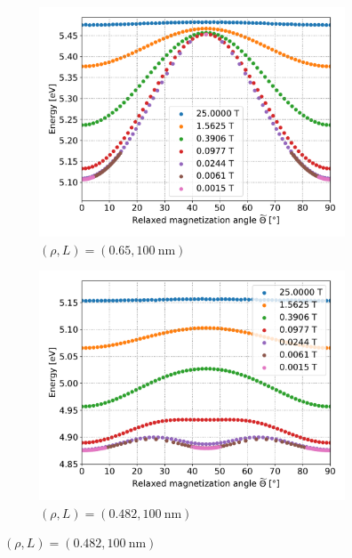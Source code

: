\documentclass[11pt,a4paper,english]{article}
\begin{document}
\begin{figure}
     \centering
     \begin{subfigure}[b]{0.8\textwidth}
         \centering
         \includegraphics[width=\textwidth]{Figures/biaxial_island/BarrierLandscape/Plus_65_B25-0.001-div4_a128Pi_plotOptimized.pdf}
         \caption{$(\rho, L)=(0.65, \SI{100}{\nano\metre})$}
         \label{fig:barrierLandscape-sweepBext_r0.65}
     \end{subfigure}
     \begin{subfigure}[b]{0.8\textwidth}
         \centering
         \includegraphics[width=\textwidth]{Figures/biaxial_island/BarrierLandscape/Plus_48.2_B25-0.001-div4_a128Pi_plotOptimized.pdf}
         \caption{$(\rho, L)=(0.482, \SI{100}{\nano\metre})$}

\end{subfigure}
\end{figure}
\end{document}

